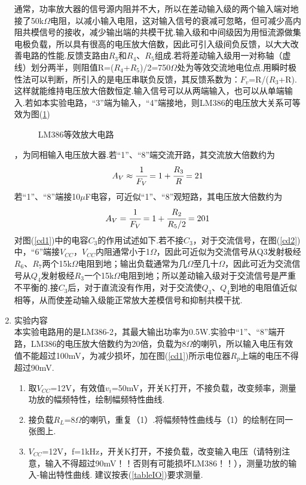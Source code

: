 \documentclass[a4paper]{article}
\begin{document}
\begin{enumerate}
通常，功率放大器的信号源内阻并不大，所以在差动输入级的两个输入端对地接了50k$\Omega$电阻，以减小输入电阻，这对输入信号的衰减可忽略，但可减少高内阻共模信号的接收，减少输出端的共模干扰.输入级和中间级因为用恒流源做集电极负载，所以具有很高的电压放大倍数，因此可引入级间负反馈，以大大改善电路的性能.反馈支路由$R_3$和$R_4$、$R_5$组成.若将差动输入级用一对称轴（虚线）划分两半，则阻值R=($R_4$+$R_5$)/2=750$\Omega$处为等效交流地电位点.用瞬时极性法可以判断，所引入的是电压串联负反馈，其反馈系数为：$F_v$=R/($R_3$+R).这样就能维持电压放大倍数恒定.输入信号可以从两端输入，也可以从单端输入.若如本实验电路，“3”端为输入，“4”端接地，则LM386的电压放大关系可等效为图(\ref{cd3})
\begin{figure}[!h]
\centering
{}
\caption{LM386等效放大电路}\label{cd3}
\end{figure}
，为同相输入电压放大器.若“1”、“8”端交流开路，其交流放大倍数约为
\begin{equation}
A_V \approx \cfrac{1}{F_V} = 1+\cfrac{R_3}{R} = 21\label{eq1}
\end{equation}
若“1”、“8”端接10$\mu$F电容，可近似“1”、“8”观短路，其电压放大倍数约为
\begin{equation}
A_V = \cfrac{1}{F_V} = 1+\cfrac{R_2}{R_5/2} = 201
\end{equation}
对图(\ref{cd1})中的电容$C_3$的作用试述如下.若不接$C_3$，对于交流信号，在图(\ref{cd2})中，“6”端接$V_{CC}$，$V_{CC}$内阻通常小于1$\Omega$，因此可近似为交流信号从Q3发射极经$R_6$、$R_7$两个15k$\Omega$电阻到地；输出负载通常为几$\Omega$至几十$\Omega$，因此可近为交流信号从$Q_4$发射极经$R_3$一个15k$\Omega$电阻到地；所以差动输入级对于交流信号是严重不平衡的.接$C_3$后，对于直流没有作用，对于交流使$Q_3$、$Q_4$到地的电阻值近似相等，从而使差动输入级能正常放大差模信号和抑制共模干扰.

\item 实验内容\\
本实验电路用的是LM386-2，其最大输出功率为0.5W.实验中“1”、“8”端开路，LM386的电压放大倍数约为20倍，负载为8$\Omega$的喇叭，所以输入电压有效值不能超过100mV，为减少损坏，加在图(\ref{cd1})所示电位器$R_p$上端的电压不得超过90mV.
\begin{enumerate}
\item 取$V_{CC}$=12V，有效值$v_i$=50mV，开关K打开，不接负载，改变频率，测量功放的幅频特性，绘制幅频特性曲线.
\item 接负载$R_L$=8$\Omega$的喇叭，重复（1）.将幅频特性曲线与（1）的绘制在同一张图上.
\item $V_{CC}$=12V，f=1kHz，开关K打开，不接负载，改变输入电压（请特别注意，输入不得超过90mV！！否则有可能损坏LM386！！），测量功放的输入-输出特性曲线.
建议按表(\ref{tableIO})要求测量.


\end{enumerate}
\end{enumerate}
\end{document}
